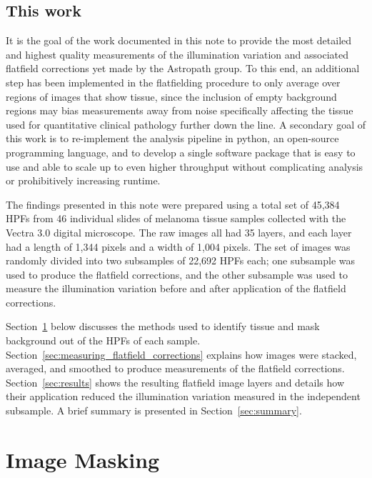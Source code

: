 \documentclass[letterpaper,11pt]{article}
\newcommand{\refsec}[1]{Section~\ref{#1}}
\begin{document}
\subsection{This work}
\label{ssec:this_work}

It is the goal of the work documented in this note to provide the most detailed and highest quality measurements of the illumination variation and associated flatfield corrections yet made by the Astropath group. To this end, an additional step has been implemented in the flatfielding procedure to only average over regions of images that show tissue, since the inclusion of empty background regions may bias measurements away from noise specifically affecting the tissue used for quantitative clinical pathology further down the line. A secondary goal of this work is to re-implement the analysis pipeline in python, an open-source programming language, and to develop a single software package that is easy to use and able to scale up to even higher throughput without complicating analysis or prohibitively increasing runtime.

The findings presented in this note were prepared using a total set of 45,384 HPFs from 46 individual slides of melanoma tissue samples collected with the Vectra 3.0 digital microscope. The raw images all had 35 layers, and each layer had a length of 1,344 pixels and a width of 1,004 pixels. The set of images was randomly divided into two subsamples of 22,692 HPFs each; one subsample was used to produce the flatfield corrections, and the other subsample was used to measure the illumination variation before and after application of the flatfield corrections.

\refsec{sec:image_masking} below discusses the methods used to identify tissue and mask background out of the HPFs of each sample. \refsec{sec:measuring_flatfield_corrections} explains how images were stacked, averaged, and smoothed to produce measurements of the flatfield corrections. \refsec{sec:results} shows the resulting flatfield image layers and details how their application reduced the illumination variation measured in the independent subsample. A brief summary is presented in \refsec{sec:summary}.

\section{Image Masking}
\label{sec:image_masking}
\end{document}
